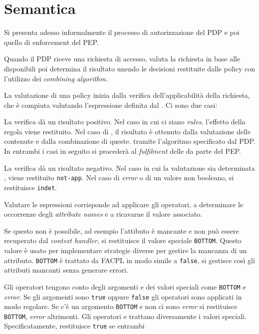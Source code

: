 \section{Semantica }
\label{sec:Semantica }
Si presenta adesso informalmente il processo di autorizzazione del PDP e poi quello di enforcement del PEP.\par
Quando il PDP riceve una richiesta di accesso, valuta la richiesta in base alle \epolicy disponibili poi determina
il risultato unendo le decisioni restituite dalle policy con l'utilizzo dei \emph{combining algorithm}.\par
La valutazione di una policy inizia dalla verifica dell'applicabilità della richiesta, che è compiuta valutando
l'espressione definita dal \etarget. Ci sono due casi:
\begin{description}
  \item La verifica dà un risultato positivo. Nel caso in cui ci siano \emph{rules}, l'effetto della regola viene restituito.
        Nel caso di \ePolicySet, il risultato è ottenuto dalla valutazione delle \epolicy contenute e dalla combinazione di queste.
        tramite l'algoritmo specificato dal PDP. In entrambi i casi in seguito si procederà al \emph{fulfilment} delle
        \eobligation da parte del PEP.
  \item La verifica dà un risultato negativo. Nel caso in cui la valutazione sia determinata \efalse, viene restituito
        \texttt{not-app}. Nel caso di \emph{error} o di un valore non booleano, si restituisce \texttt{indet}.
\end{description}
Valutare le espressioni corrisponde ad applicare gli operatori, a determinare le occorrenze degli \emph{attribute names} e
a ricavarne il valore associato.\par
Se questo non è possibile, ad esempio l'attibuto è mancante e non può essere recuperato dal \emph{context handler}, si
restituisce il valore speciale \texttt{BOTTOM}. Questo valore è usato per implementare strategie diverse per gestire
la mancanza di un attributo. \texttt{BOTTOM} è trattato da FACPL in modo simile a \texttt{false}, si gestisce
così gli attributi mancanti senza generare errori.\par
Gli operatori tengono conto degli argomenti e dei valori speciali come \texttt{BOTTOM} e \emph{error}.
Se gli argomenti sono \texttt{true} oppure \texttt{false} gli operatori sono applicati in modo regolare.
Se c'è un argomento \texttt{BOTTOM} e non ci sono \emph{error} si restituisce \texttt{BOTTOM}, \emph{error} altrimenti.
Gli operatori \eand e \eor trattano diversamente i valori speciali. Specificatamente, \eand restituisce \texttt{true} se entrambi
